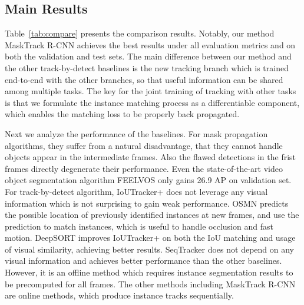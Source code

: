 \subsection{Main Results}
Table~\ref{tab:compare} presents the comparison results. Notably, our method MaskTrack R-CNN achieves the best results under all evaluation metrics and on both the validation and test sets. The main difference between our method and the other track-by-detect baselines is the new tracking branch which is trained end-to-end with the other branches, so that useful information can be shared among multiple tasks. The key for the joint training of tracking with other tasks is that we formulate the instance matching process as a differentiable component, which enables the matching loss to be properly back propagated. 

Next we analyze the performance of the baselines. For mask propagation algorithms, they suffer from a natural disadvantage, that they cannot handle objects appear in the intermediate frames. Also the flawed detections in the frist frames directly degenerate their performance. Even the state-of-the-art video object segmentation algorithm FEELVOS only gains 26.9 AP on validation set. For track-by-detect algorithm, IoUTracker+ does not leverage any visual information which is not surprising to gain weak performance. OSMN predicts the possible location of previously identified instances at new frames, and use the prediction to match instances, which is useful to handle occlusion and fast motion. DeepSORT improves IoUTracker+ on both the IoU matching and usage of visual similarity, achieving better results. SeqTracker does not depend on any visual information and achieves better performance than the other baselines. However, it is an offline method which requires instance segmentation results to be precomputed for all frames. The other methods including MaskTrack R-CNN are online methods, which produce instance tracks sequentially. 



